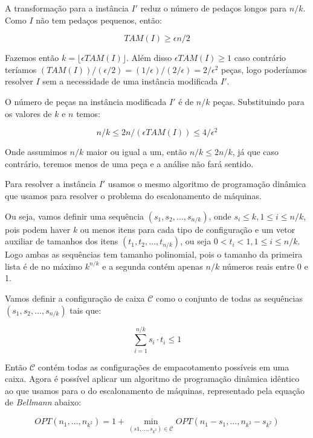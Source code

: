 A transformação para a instância $I'$ reduz o número de pedaços longos para $n/k$. Como $I$ não tem pedaços pequenos, então:

\begin{equation}
TAM(I) \geq \epsilon n / 2
\end{equation}

Fazemos então $k = \lfloor \epsilon TAM(I) \rfloor$. Além disso $\epsilon TAM(I) \geq 1$ caso contrário teríamos $(TAM(I))/(\epsilon/2) = (1/\epsilon)/(2/\epsilon) = 2/\epsilon^2$ peças, logo poderíamos resolver $I$ sem a necessidade de uma instância modificada $I'$.

O número de peças na instância modificada $I'$ é de $n/k$ peças. Substituindo para os valores de $k$ e $n$ temos:

\begin{equation}
n/k \leq 2n/(\epsilon TAM(I)) \leq 4/\epsilon^2
\end{equation}

Onde assumimos $n/k$ maior ou igual a um, então $n/k \leq 2n/k$, já que caso contrário, teremos menos de uma peça e a análise não fará sentido.

Para resolver a instância $I'$ usamos o mesmo algoritmo de programação dinâmica que usamos para resolver o problema do escalonamento de máquinas.

Ou seja, vamos definir uma sequência $(s_1,s_2,\ldots,s_{n/k})$, onde $s_i \leq k, 1 \leq i \leq n/k$, pois podem haver $k$ ou menos itens para cada tipo de configuração e um vetor auxiliar de tamanhos dos itens $(t_1,t_2,\ldots,t_{n/k})$, ou seja $0 < t_i < 1, 1 \leq i \leq n/k$. Logo ambas as sequências tem tamanho polinomial, pois o tamanho da primeira lista é de no máximo $k^{n/k}$ e a segunda contém apenas $n/k$ números reais entre 0 e 1.

Vamos definir a configuração de caixa  $ \mathcal{C} $ como o conjunto de todas as sequências $(s_1,s_2,\ldots,s_{n/k})$ tais que:

\begin{equation}
\sum_{i=1}^{n/k} s_i \cdot t_i \leq 1
\end{equation}

Então $ \mathcal{C} $ contém todas as configurações de empacotamento possíveis em uma caixa. Agora é possível aplicar um algoritmo de programação dinâmica idêntico ao que usamos para o do escalonamento de máquinas, representado pela equação de \textit{Bellmann} abaixo:

\begin{equation}
OPT(n_1, \ldots, n_{k^2}) = 1 + \min_{(s1,\ldots,s_{k^2}) \in \mathcal{C}} OPT(n_1 - s_1, \ldots, n_{k^2} - s_{k^2})
\end{equation}


